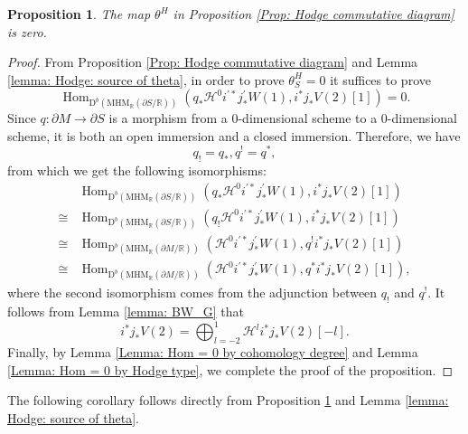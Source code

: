 \documentclass[11pt, a4paper]{amsart}
\theoremstyle{plain}
\newtheorem{proposition}[theorem]{Proposition}
\theoremstyle{definition}
\numberwithin{equation}{section}
\def\RR{\mathbb{R}}
\DeclareMathOperator{\Hom}{Hom}
\begin{document}
\begin{proposition}
\label{Prop: Hdg theta is zero}
    The map $\theta^{H}$ in Proposition \ref{Prop: Hodge commutative diagram} is zero. 
\end{proposition}
\begin{proof}
    \par From Proposition \ref{Prop: Hodge commutative diagram} and Lemma \ref{lemma: Hodge: source of theta}, in order to prove $\theta^{H}_{S} = 0$ it suffices to prove 
    \begin{equation*}
        \Hom_{\mathrm{D}^{b}(\mathrm{MHM}_{\RR}(\partial S/\RR))}(q_{*}\mathcal{H}^{0}i^{\prime*}j^{\prime}_{*}W(1), i^{*}j_{*}V(2)[1]) = 0. 
    \end{equation*}
    Since $q \colon \partial M \rightarrow \partial S$ is a morphism from a $0$-dimensional scheme to a $0$-dimensional scheme, it is both an open immersion and a closed immersion. Therefore, we have
    \begin{equation*}
        q_{!} = q_{*}, q^{!} = q^{*}, 
    \end{equation*}
    from which we get the following isomorphisms:
    \begin{align*}
        & \Hom_{\mathrm{D}^{b}(\mathrm{MHM}_{\RR}(\partial S/\RR))}(q_{*}\mathcal{H}^{0}i^{\prime*}j_{*}^{\prime}W(1), i^{*}j_{*}V(2)[1]) \\ 
    \cong & \Hom_{\mathrm{D}^{b}(\mathrm{MHM}_{\RR}(\partial S/\RR))}(q_{!}\mathcal{H}^{0}i^{\prime*}j_{*}^{\prime}W(1), i^{*}j_{*}V(2)[1]) \\
    \cong & \Hom_{\mathrm{D}^{b}(\mathrm{MHM}_{\RR}(\partial M/\RR))}(\mathcal{H}^{0}i^{\prime*}j_{*}^{\prime}W(1), q^{!}i^{*}j_{*}V(2)[1]) \\
    \cong & \Hom_{\mathrm{D}^{b}(\mathrm{MHM}_{\RR}(\partial M/\RR))}(\mathcal{H}^{0}i^{\prime*}j_{*}^{\prime}W(1), q^{*}i^{*}j_{*}V(2)[1]), 
    \end{align*}
    where the second isomorphism comes from the adjunction between $q_{!}$ and $q^{!}$. 
    It follows from Lemma \ref{lemma: BW_G} that 
    \begin{equation*}
        i^{*}j_{*}V(2) = \bigoplus_{l = -2}^{1} \mathcal{H}^{l}i^{*}j_{*}V(2)[-l]. 
    \end{equation*}
    Finally, by Lemma \ref{Lemma: Hom = 0 by cohomology degree} and Lemma \ref{Lemma: Hom = 0 by Hodge type}, we complete the proof of the proposition.
\end{proof}

The following corollary follows directly from Proposition \ref{Prop: Hdg theta is zero} and Lemma \ref{lemma: Hodge: source of theta}. 
\end{document}
